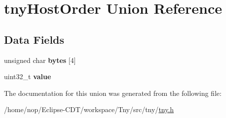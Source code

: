 \hypertarget{uniontnyHostOrder}{\section{tny\-Host\-Order \-Union \-Reference}
\label{uniontnyHostOrder}
}
\subsection*{\-Data \-Fields}
\begin{DoxyCompactItemize}
\item 
\hypertarget{uniontnyHostOrder_acb739679aaa1bd09e24d4beaa7be664d}{unsigned char {\bfseries bytes} \mbox{[}4\mbox{]}}\label{uniontnyHostOrder_acb739679aaa1bd09e24d4beaa7be664d}

\item 
\hypertarget{uniontnyHostOrder_af1709a3a3564c5b566aedc547311bd91}{uint32\-\_\-t {\bfseries value}}\label{uniontnyHostOrder_af1709a3a3564c5b566aedc547311bd91}

\end{DoxyCompactItemize}


\-The documentation for this union was generated from the following file\-:\begin{DoxyCompactItemize}
\item 
/home/nop/\-Eclipse-\/\-C\-D\-T/workspace/\-Tny/src/tny/\hyperlink{tny_8h}{tny.\-h}\end{DoxyCompactItemize}
